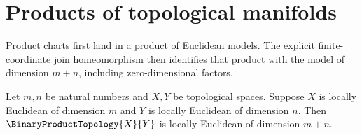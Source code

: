 \section{Products of topological manifolds}






Product charts first land in a product of Euclidean models. The explicit
finite-coordinate join homeomorphism then identifies that product with the
model of dimension $m+n$, including zero-dimensional factors.

\begin{theorem}\label{product_of_locally_euclidean_spaces}
    Let $m,n$ be natural numbers and $X,Y$ be topological spaces.
    Suppose $X$ is locally Euclidean of dimension $m$ and
        $Y$ is locally Euclidean of dimension $n$.
    Then $\BinaryProductTopology{X}{Y}$ is locally Euclidean of dimension $m+n$.
\end{theorem}
